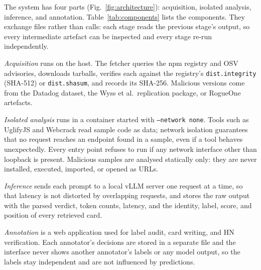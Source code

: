 \documentclass[a4paper,fleqn]{cas-dc}
\begin{document}
The system has four parts (Fig.~\ref{fig:architecture}): acquisition, isolated
analysis, inference, and annotation. Table~\ref{tab:components} lists the
components. They exchange files rather than calls: each stage reads the
previous stage's output, so every intermediate artefact can be inspected and
every stage re-run independently.

\emph{Acquisition} runs on the host. The fetcher queries the npm registry and
OSV advisories, downloads tarballs, verifies each against the registry's
\texttt{dist.integrity} (SHA-512) or \texttt{dist.shasum}, and records its
SHA-256. Malicious versions come from the Datadog dataset, the Wyss et al.\
replication package, or RogueOne artefacts.

\emph{Isolated analysis} runs in a container started with
\texttt{--network none}. Tools such as UglifyJS and Webcrack read sample code
as data; network isolation guarantees that no request reaches an endpoint
found in a sample, even if a tool behaves unexpectedly. Every entry point
refuses to run if any network interface other than loopback is present.
Malicious samples are analysed statically only: they are never installed,
executed, imported, or opened as URLs.

\emph{Inference} sends each prompt to a local vLLM server one request at a
time, so that latency is not distorted by overlapping requests, and stores the
raw output with the parsed verdict, token counts, latency, and the identity,
label, score, and position of every retrieved card.

\emph{Annotation} is a web application used for label audit, card writing, and
HN verification. Each annotator's decisions are stored in a separate file and
the interface never shows another annotator's labels or any model output, so
the labels stay independent and are not influenced by predictions.
\end{document}
